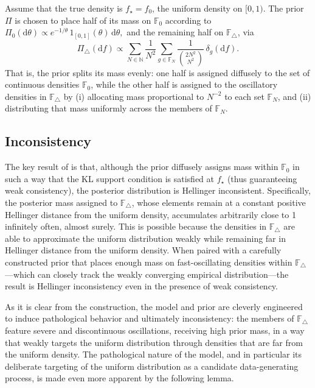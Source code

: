 \documentclass[11pt,twoside]{article}
\def\NN{\mathbb{N}}
\def\FF{\mathbb{F}}
\def\FF{\mathbb{F}}
\begin{document}
Assume that the true density is $f_\star = f_0$, the uniform density on $[0,1)$. The prior $\Pi$ is chosen to place half of its mass on $\FF_0$ according to
%
 $   \Pi_0(\mathrm d\theta) \propto e^{-1/\theta}\,1_{[0,1]}(\theta)\,\mathrm d\theta,$
%
and the remaining half on $\FF_\triangle$, via
%
\begin{equation*}
    \Pi_\triangle(\mathrm df) \propto \sum_{N \in \NN} \frac{1}{N^2} \sum_{g \in \FF_N} \frac{1}{\binom{2N^2}{N^2}}\,\delta_g(\mathrm df).
\end{equation*}
%
That is, the prior splits its mass evenly: one half is assigned diffusely to the set of continuous densities $\FF_0$, while the other half is assigned to the oscillatory densities in $\FF_\triangle$ by (i) allocating mass proportional to $N^{-2}$ to each set $\FF_N$, and (ii) distributing that mass uniformly across the members of $\FF_N$.


\subsection{Inconsistency}



The key result of \cite{barron1988exponential} is that, although the prior diffusely assigns mass within $\FF_0$ in such a way that the KL support condition is satisfied at $f_\star$ (thus guaranteeing weak consistency), the posterior distribution is Hellinger inconsistent. Specifically, the posterior mass assigned to $\FF_\triangle$, whose elements remain at a constant positive Hellinger distance from the uniform density, accumulates arbitrarily close to 1 infinitely often, almost surely. This is possible because the densities in $\FF_\triangle$ are able to approximate the uniform distribution weakly while remaining far in Hellinger distance from the uniform density. When paired with a carefully constructed prior that places enough mass on fast-oscillating densities within $\FF_\triangle$—which can closely track the weakly converging empirical distribution—the result is Hellinger inconsistency even in the presence of weak consistency.

As it is clear from the construction, the model and prior are cleverly engineered to induce pathological behavior and ultimately inconsistency: the members of $\FF_\triangle$ feature severe and discontinuous oscillations, receiving high prior mass, in a way that weakly targets the uniform distribution through densities that are far from the uniform density. The pathological nature of the model, and in particular its deliberate targeting of the uniform distribution as a candidate data-generating process, is made even more apparent by the following lemma.
\end{document}
